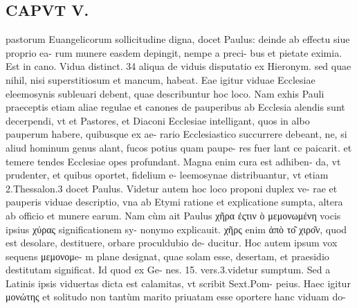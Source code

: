 \documentclass{article}
\begin{document}
\begin{pages}
\section*{CAPVT V. }
\marginpar{[ p.257 ]}\pstart pastorum Euangelicorum sollicitudine digna, docet Paulus: deinde ab effectu siue proprio ea- rum munere easdem depingit, nempe a preci- bus et pietate eximia. Est in cano. Vidua distinct. 34 aliqua de viduis disputatio ex Hieronym. sed quae nihil, nisi superstitiosum et mancum, habeat. Eae igitur viduae Ecclesiae eleemosynis subleuari debent, quae describuntur hoc loco. Nam exhis Pauli praeceptis etiam aliae regulae et canones de pauperibus ab Ecclesia alendis sunt decerpendi, vt et Pastores, et Diaconi Ecclesiae intelligant, quos in albo pauperum habere, quibusque ex ae- rario Ecclesiastico succurrere debeant, ne, si aliud hominum genus alant, fucos potius quam paupe- res fuer lant ce paicarit. et temere tendes Ecclesiae opes profundant. Magna enim cura est adhiben- da, vt prudenter, et quibus oportet, fidelium e- leemosynae distribuantur, vt etiam 2.Thessalon.3 docet Paulus.  \pend\pstart Videtur autem hoc loco proponi duplex ve- rae et pauperis viduae descriptio, vna ab Etymi ratione et explicatione sumpta, altera ab officio et munere earum. Nam cùm ait Paulus χῆρα ἐςτιν ὸ μεμονωμένη vocis ipsius χύρας significationem sy- nonymo explicauit. χῆρς enim ἀπὸ το͂ χιρο͂ν, quod est desolare, destituere, orbare proculdubio de- ducitur. Hoc autem ipsum vox sequens μεμονομe- m plane designat, quae solam esse, desertam, et praesidio destitutam significat. Id quod ex Ge- nes. 15. vers.3.videtur sumptum. Sed a Latinis ipsis viduertas dicta est calamitas, vt scribit Sext.Pom- peius. Haec igitur μονώτης et solitudo non tantùm marito priuatam esse oportere hanc viduam do-  \pend

\end{pages}
\end{document}

